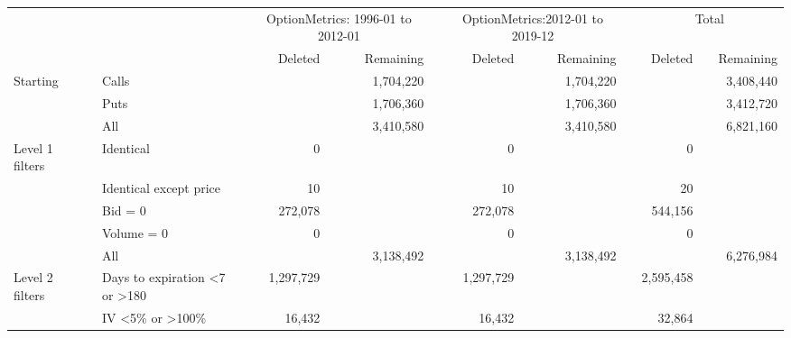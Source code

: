 

    \begin{tabular}{*{4}{l} *{11}{r} }
       
        
         \multicolumn{4}{c}{}  & \multicolumn{3}{c}{OptionMetrics: 1996-01 to 2012-01}  &  \multicolumn{1}{c}{} & 
         \multicolumn{3}{c}{OptionMetrics:2012-01 to 2019-12}&  \multicolumn{1}{c}{}  &
          \multicolumn{3}{c}{Total}  \\
         \cline{5-7}
                  
         \cline{9-11}
         \cline{13-15}
         
          &  & & & 
          Deleted &  & Remaining & &
          Deleted &  & Remaining & &
          Deleted &  & Remaining 
          \\

       \hline

	
				Starting & & Calls & &
				 & & 1,704,220 & &
				 & & 1,704,220 & &
				 & & 3,408,440 \\
			
				  & & Puts & &
				 & & 1,706,360 & &
				 & & 1,706,360 & &
				 & & 3,412,720 \\
			
				  & & All & &
				 & & 3,410,580 & &
				 & & 3,410,580 & &
				 & & 6,821,160 \\
			
				Level 1 filters & & Identical & &
				0 & &  & &
				0 & &  & &
				0 & &  \\
			
				  & & Identical except price & &
				10 & &  & &
				10 & &  & &
				20 & &  \\
			
				  & & Bid = 0 & &
				272,078 & &  & &
				272,078 & &  & &
				544,156 & &  \\
			
				  & & Volume = 0 & &
				0 & &  & &
				0 & &  & &
				0 & &  \\
			
				  & & All & &
				 & & 3,138,492 & &
				 & & 3,138,492 & &
				 & & 6,276,984 \\
			
				Level 2 filters & & Days to expiration <7 or >180 & &
				1,297,729 & &  & &
				1,297,729 & &  & &
				2,595,458 & &  \\
			
				  & & IV <5\% or >100\% & &
				16,432 & &  & &
				16,432 & &  & &
				32,864 & &  \\
			

\end{tabular}
